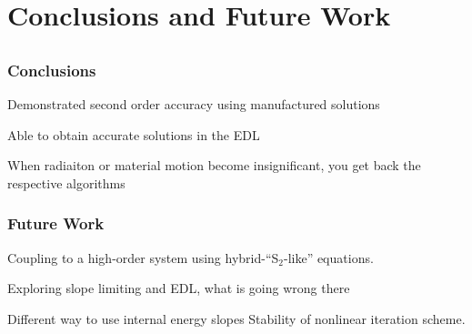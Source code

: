 \documentclass[xcolor=dvipsnames,fontsize=8pt]{beamer}
\begin{document}
\section{Conclusions and Future Work}
\subsection{}

\begin{frame}
    \frametitle{Conclusions}
    
    Demonstrated second order accuracy using manufactured solutions

    Able to obtain accurate solutions in the EDL

    When radiaiton or material motion become insignificant, you get back the
    respective algorithms

\end{frame}




\begin{frame}
    \frametitle{Future Work}
    
    Coupling to a high-order system using hybrid-``S$_2$-like'' equations.

    Exploring slope limiting and EDL, what is going wrong there

    Different way to use internal energy slopes
        Stability of nonlinear iteration scheme.
 \end{frame}
\end{document}
